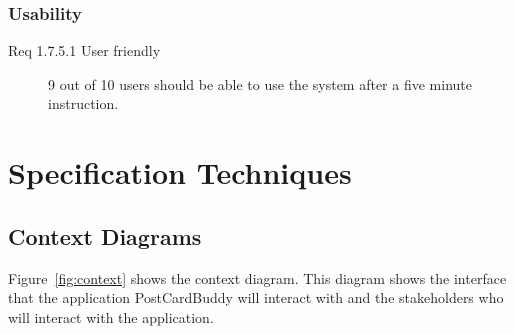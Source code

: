 \documentclass[10pt,a4paper]{article}
\begin{document}
\subsubsection{Usability}
\begin{description}
\item [Req 1.7.5.1 User friendly] 9 out of 10 users should be able to use the system after a five minute instruction.
\end{description}






\section{Specification Techniques}
\subsection{Context Diagrams}
Figure~\ref{fig:context} shows the context diagram. This diagram shows the interface that the application PostCardBuddy will interact with and the stakeholders who will interact with the application.
\end{document}
